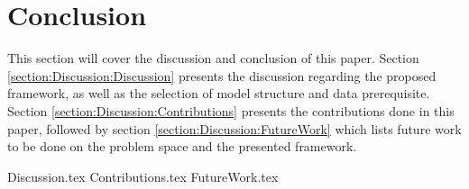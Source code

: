 \chapter{Conclusion}

\label{section:Discussion}

This section will cover the discussion and conclusion of this paper.
Section \ref{section:Discussion:Discussion} presents the discussion regarding the proposed framework,
as well as the selection of model structure and data prerequisite.
Section \ref{section:Discussion:Contributions} presents the contributions done in this paper,
followed by section \ref{section:Discussion:FutureWork} which lists future work to be done on the problem space and the presented framework.


{Discussion.tex}
{Contributions.tex}
{FutureWork.tex}


